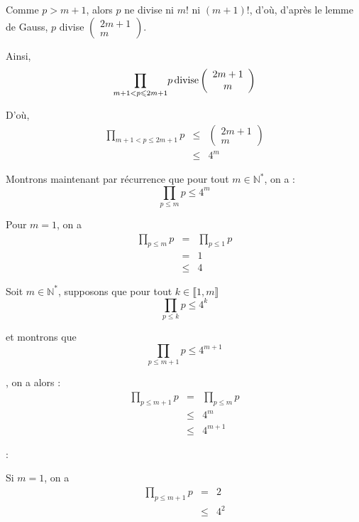 Comme $p > m + 1$, alors $p$ ne divise ni $m!$ ni $(m + 1) !$, d'o{\`u},
d'apr{\`e}s le lemme de Gauss, $p$ divise $\left( \begin{array}{c}
  2 m + 1\\
  m
\end{array} \right)$.

Ainsi,
\[ \underset{m + 1 < p \leqslant 2 m + 1}{\prod} p \operatorname{divise} \left(
   \begin{array}{c}
     2 m + 1\\
     m
   \end{array} \right) \]


D'o{\`u},
\begin{eqnarray*}
  \underset{m + 1 < p \leqslant 2 m + 1}{\prod} p & \leqslant & \left(
  \begin{array}{c}
    2 m + 1\\
    m
  \end{array} \right)\\
  & \leqslant & 4^m
\end{eqnarray*}


Montrons maintenant par r{\'e}currence que pour tout $m \in
\mathbb{N}^{\ast}$, on a :
\[ \underset{p \leqslant m}{\prod} p \leqslant 4^m \]


Pour $m = 1$, on a
\begin{eqnarray*}
  \underset{p \leqslant m}{\prod} p & = & \underset{p \leqslant 1}{\prod} p\\
  & = & 1\\
  & \leqslant & 4
\end{eqnarray*}


Soit $m \in \mathbb{N}^{\ast}$, supposons que pour tout $k \in \llbracket 1, m
\rrbracket$
\[ \underset{p \leqslant k}{\prod} p \leqslant 4^k \]


et montrons que
\[ \underset{p \leqslant m + 1}{\prod} p \leqslant 4^{m + 1} \]


, on a alors :
\begin{eqnarray*}
  \underset{p \leqslant m + 1}{\prod} p & = & \underset{p \leqslant m}{\prod}
  p\\
  & \leqslant & 4^m\\
  & \leqslant & 4^{m + 1}
\end{eqnarray*}


 :

Si $m = 1$, on a
\begin{eqnarray*}
  \underset{p \leqslant m + 1}{\prod} p & = & 2\\
  & \leqslant & 4^2
\end{eqnarray*}


